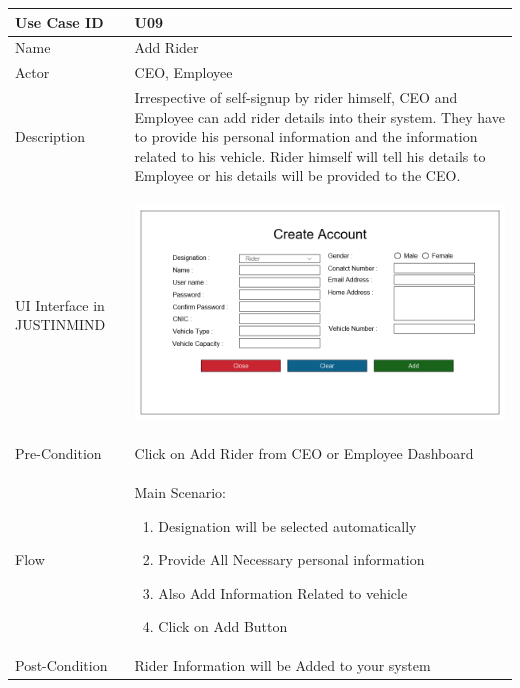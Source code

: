 \documentclass[12pt,a4paper]{report}
\begin{document}
\begin{tabular}{ | m{3cm} | m{12cm}| } \hline

Use Case ID &  U09 \\\hline

Name  	    &  Add Rider \\ \hline

Actor     	&  CEO, Employee\\ \hline

Description & Irrespective of self-signup by rider himself, CEO and Employee can add rider details into their system. They have to provide his personal information and the information related to his vehicle. Rider himself will tell his details to Employee or his details will be provided to the CEO. \\ \hline

UI Interface in JUSTINMIND & \begin{center} \includegraphics[scale=0.3]{./UIs for Latex Reports/UI-020 AddRider@1x.png}\end{center}  \\ \hline

Pre-Condition & Click on Add Rider from CEO or Employee Dashboard  \\ \hline


Flow & Main Scenario:

\begin{enumerate}
\item   Designation will be selected automatically
\item  Provide All Necessary personal information
\item  Also Add Information Related to vehicle
\item  Click on Add Button


\end{enumerate}

\\ \hline
Post-Condition &  Rider Information will be Added to your system  \\ \hline

\end{tabular}
\end{document}

